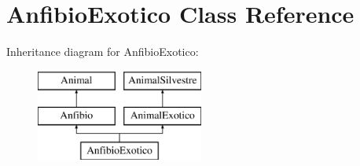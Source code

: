 \hypertarget{class_anfibio_exotico}{}\section{Anfibio\+Exotico Class Reference}
\label{class_anfibio_exotico}
Inheritance diagram for Anfibio\+Exotico\+:\begin{figure}[H]
\begin{center}
\leavevmode
\includegraphics[height=3.000000cm]{class_anfibio_exotico}
\end{center}
\end{figure}
